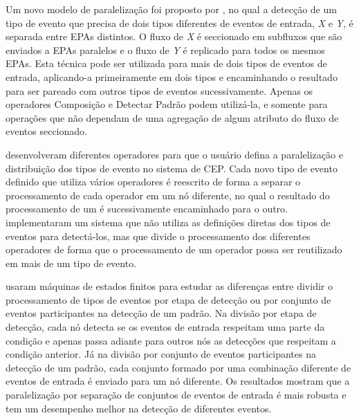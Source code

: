 Um novo modelo de paralelização foi proposto por \cite{doi:10.1177/1550147717728626}, no qual a detecção de um tipo de evento que precisa de dois tipos diferentes de eventos de entrada, \textit{X} e \textit{Y}, é separada entre EPAs distintos. O fluxo de \textit{X} é seccionado em subfluxos que são enviados a EPAs paralelos e o fluxo de \textit{Y} é replicado para todos os mesmos EPAs. Esta técnica pode ser utilizada para mais de dois tipos de eventos de entrada, aplicando-a primeiramente em dois tipos e encaminhando o resultado para ser pareado com outros tipos de eventos  sucessivamente. Apenas os operadores Composição e Detectar Padrão podem utilizá-la, e somente para operações que não dependam de uma agregação de algum atributo do fluxo de eventos seccionado.




\cite{JAYASEKARA201542} desenvolveram diferentes operadores para que o usuário defina a paralelização e distribuição dos tipos de evento no sistema de CEP. Cada novo tipo de evento definido que utiliza vários operadores é reescrito de forma a separar o processamento de cada operador em um nó diferente, no qual o resultado do processamento de um é sucessivamente encaminhado para o outro. \cite{Schultz-Moller:2009:DCE:1619258.1619264} implementaram um sistema que não utiliza as definições diretas dos tipos de eventos para detectá-los, mas que divide o processamento dos diferentes operadores de forma que o processamento de um operador possa ser reutilizado em mais de um tipo de evento. 

\cite{Balkesen:2013:RRI:2488222.2488257} usaram máquinas de estados finitos para estudar as diferenças entre dividir o processamento de tipos de eventos por etapa de detecção ou por conjunto de eventos participantes na detecção de um padrão. Na divisão por etapa de detecção, cada nó detecta se os eventos de entrada respeitam uma parte da condição e apenas passa adiante para outros nós as detecções que respeitam a condição anterior. Já na divisão por conjunto de eventos participantes na detecção de um padrão, cada conjunto formado por uma combinação diferente de eventos de entrada é enviado para um nó diferente. Os resultados mostram que a paralelização por separação de conjuntos de eventos de entrada é mais robusta e tem um desempenho melhor na detecção de diferentes eventos. 

